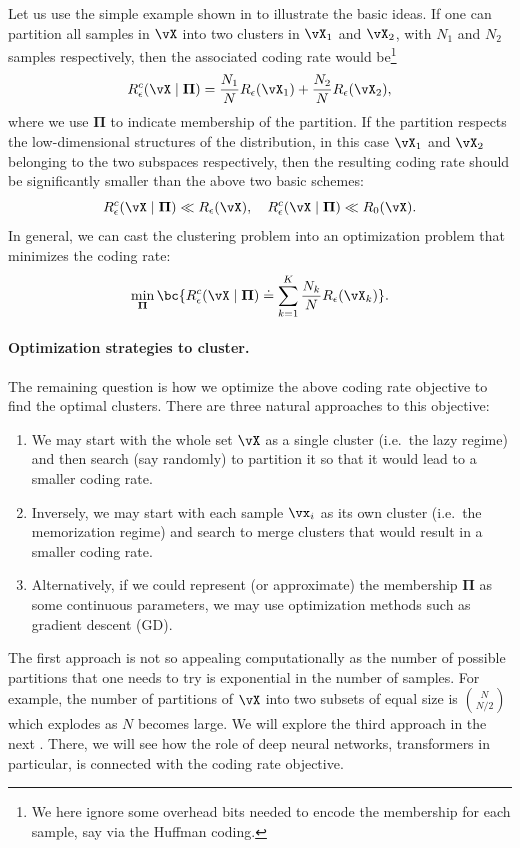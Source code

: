 \documentclass[../../book-main.tex]{subfiles}
\begin{document}
Let us use the simple example shown in  to
illustrate the basic ideas. If one can partition all samples in $\vX$
into two clusters in $\vX_1$ and $\vX_2$, with $N_1$ and $N_2$ samples
respectively, then the associated coding rate would be\footnote{We
    here ignore some overhead bits needed to encode the membership for
each sample, say via the Huffman coding.}
\begin{equation}
    R_{\epsilon}^c(\vX\mid \boldsymbol{\Pi}) =
    \frac{N_1}{N}R_{\epsilon}(\vX_1) + \frac{N_2}{N}R_{\epsilon}(\vX_2),
\end{equation}
where we use $\boldsymbol{\Pi}$ to indicate membership of the
partition. If the partition respects the low-dimensional structures
of the distribution, in this case $\vX_1$ and $\vX_2$ belonging to the
two subspaces respectively, then the resulting coding rate should be
significantly smaller than the above two basic schemes:
\begin{equation}
    R_{\epsilon}^c(\vX \mid \boldsymbol{\Pi}) \ll R_{\epsilon}(\vX),
    \quad     R_{\epsilon}^c(\vX \mid \boldsymbol{\Pi}) \ll R_0(\vX).
\end{equation}
In general, we can cast the clustering problem into an optimization
problem that minimizes the coding rate:
\begin{equation}
    \min_{\boldsymbol{\Pi}}  \bc{ R_{\epsilon}^c(\vX \mid \boldsymbol{\Pi})
    \doteq \sum_{k=1}^K \frac{N_k}{N}R_{\epsilon}(\vX_k)}.
\end{equation}

\paragraph{Optimization strategies to cluster.}
The remaining question is how we optimize the above coding rate
objective to find the optimal clusters. There are three natural
approaches to this objective:
\begin{enumerate}
    \item We may start with the whole set $\vX$ as a single cluster
        (i.e.\ the lazy regime) and then search (say randomly) to
        partition it so that it would lead to a smaller coding rate.
    \item Inversely, we may start with each sample $\vx_i$ as its own cluster
        (i.e.\ the memorization regime)  and search to merge clusters
        that would result in a smaller coding rate.
    \item Alternatively, if we could represent (or approximate) the
        membership $\boldsymbol{\Pi}$ as some continuous parameters,
        we may use optimization methods such as gradient descent (GD).
\end{enumerate}
The first approach is not so appealing computationally as the number
of possible partitions that one needs to try is exponential in the
number of samples. For example, the number of partitions of $\vX$ into
two subsets of equal size is $N \choose N/2$ which explodes as $N$
becomes large. We will explore the third approach in the next
. There, we will see how the role of deep
neural networks, transformers in particular, is connected with the
coding rate objective.
\end{document}
